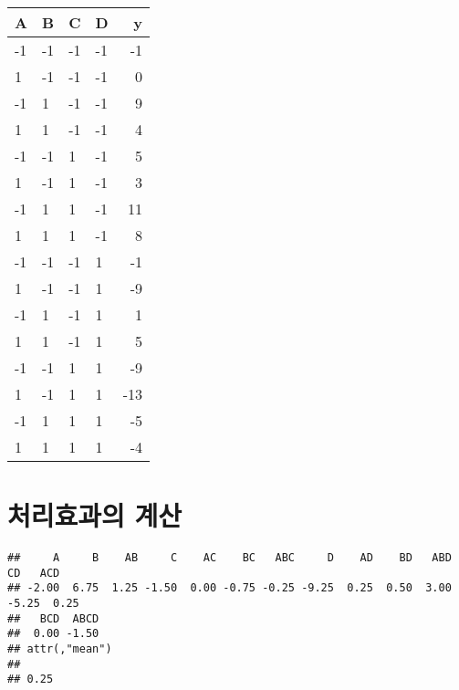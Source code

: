 \documentclass[
]{book}
\newenvironment{Shaded}{\begin{snugshade}}{\end{snugshade}}
\newcommand{\FunctionTok}[1]{\textcolor[rgb]{0.00,0.00,0.00}{#1}}
\newcommand{\NormalTok}[1]{#1}
\newcommand{\SpecialCharTok}[1]{\textcolor[rgb]{0.00,0.00,0.00}{#1}}
\newcommand{\StringTok}[1]{\textcolor[rgb]{0.31,0.60,0.02}{#1}}
\begin{document}
\begin{table}
\centering
\begin{tabular}[t]{l|l|l|l|r}
\hline
A & B & C & D & y\\
\hline
-1 & -1 & -1 & -1 & -1\\
\hline
1 & -1 & -1 & -1 & 0\\
\hline
-1 & 1 & -1 & -1 & 9\\
\hline
1 & 1 & -1 & -1 & 4\\
\hline
-1 & -1 & 1 & -1 & 5\\
\hline
1 & -1 & 1 & -1 & 3\\
\hline
-1 & 1 & 1 & -1 & 11\\
\hline
1 & 1 & 1 & -1 & 8\\
\hline
-1 & -1 & -1 & 1 & -1\\
\hline
1 & -1 & -1 & 1 & -9\\
\hline
-1 & 1 & -1 & 1 & 1\\
\hline
1 & 1 & -1 & 1 & 5\\
\hline
-1 & -1 & 1 & 1 & -9\\
\hline
1 & -1 & 1 & 1 & -13\\
\hline
-1 & 1 & 1 & 1 & -5\\
\hline
1 & 1 & 1 & 1 & -4\\
\hline
\end{tabular}
\end{table}

\hypertarget{uxcc98uxb9acuxd6a8uxacfcuxc758-uxacc4uxc0b0-1}{%
\section{처리효과의 계산}\label{uxcc98uxb9acuxd6a8uxacfcuxc758-uxacc4uxc0b0-1}}

\begin{Shaded}
\end{Shaded}

\begin{verbatim}
##     A     B    AB     C    AC    BC   ABC     D    AD    BD   ABD    CD   ACD 
## -2.00  6.75  1.25 -1.50  0.00 -0.75 -0.25 -9.25  0.25  0.50  3.00 -5.25  0.25 
##   BCD  ABCD 
##  0.00 -1.50 
## attr(,"mean")
##      
## 0.25
\end{verbatim}
\end{document}
